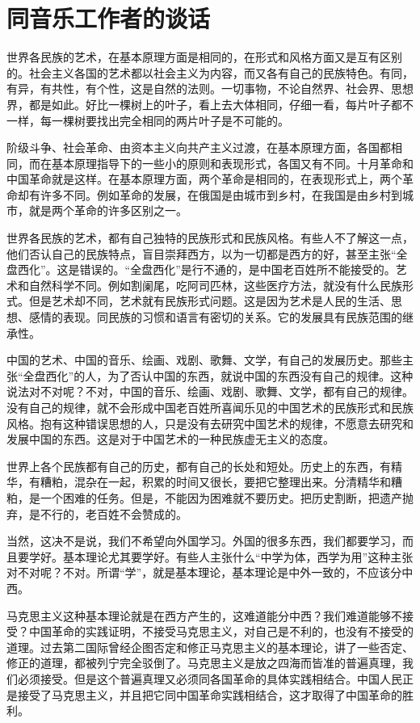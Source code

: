 \section[同音乐工作者的谈话（一九五六年八月十四日）]{同音乐工作者的谈话}


世界各民族的艺术，在基本原理方面是相同的，在形式和风格方面又是互有区别的。社会主义各国的艺术都以社会主义为内容，而又各有自己的民族特色。有同，有异，有共性，有个性，这是自然的法则。一切事物，不论自然界、社会界、思想界，都是如此。好比一棵树上的叶子，看上去大体相同，仔细一看，每片叶子都不一样，每一棵树要找出完全相同的两片叶子是不可能的。

阶级斗争、社会革命、由资本主义向共产主义过渡，在基本原理方面，各国都相同，而在基本原理指导下的一些小的原则和表现形式，各国又有不同。十月革命和中国革命就是这样。在基本原理方面，两个革命是相同的，在表现形式上，两个革命却有许多不同。例如革命的发展，在俄国是由城市到乡村，在我国是由乡村到城市，就是两个革命的许多区别之一。

世界各民族的艺术，都有自己独特的民族形式和民族风格。有些人不了解这一点，他们否认自己的民族特点，盲目崇拜西方，以为一切都是西方的好，甚至主张“全盘西化”。这是错误的。“全盘西化”是行不通的，是中国老百姓所不能接受的。艺术和自然科学不同。例如割阑尾，吃阿司匹林，这些医疗方法，就没有什么民族形式。但是艺术却不同，艺术就有民族形式问题。这是因为艺术是人民的生活、思想、感情的表现。同民族的习惯和语言有密切的关系。它的发展具有民族范围的继承性。

中国的艺术、中国的音乐、绘画、戏剧、歌舞、文学，有自己的发展历史。那些主张“全盘西化”的人，为了否认中国的东西，就说中国的东西没有自己的规律。这种说法对不对呢？不对，中国的音乐、绘画、戏剧、歌舞、文学，都有自己的规律。没有自己的规律，就不会形成中国老百姓所喜闻乐见的中国艺术的民族形式和民族风格。抱有这种错误思想的人，只是没有去研究中国艺术的规律，不愿意去研究和发展中国的东西。这是对于中国艺术的一种民族虚无主义的态度。

世界上各个民族都有自己的历史，都有自己的长处和短处。历史上的东西，有精华，有糟粕，混杂在一起，积累的时间又很长，要把它整理出来。分清精华和糟粕，是一个困难的任务。但是，不能因为困难就不要历史。把历史割断，把遗产抛弃，是不行的，老百姓不会赞成的。

当然，这决不是说，我们不希望向外国学习。外国的很多东西，我们都要学习，而且要学好。基本理论尤其要学好。有些人主张什么“中学为体，西学为用”这种主张对不对呢？不对。所谓“学”，就是基本理论，基本理论是中外一致的，不应该分中西。

马克思主义这种基本理论就是在西方产生的，这难道能分中西？我们难道能够不接受？中国革命的实践证明，不接受马克思主义，对自己是不利的，也没有不接受的道理。过去第二国际曾经企图否定和修正马克思主义的基本理论，讲了一些否定、修正的道理，都被列宁完全驳倒了。马克思主义是放之四海而皆准的普遍真理，我们必须接受。但是这个普遍真理又必须同各国革命的具体实践相结合。中国人民正是接受了马克思主义，并且把它同中国革命实践相结合，这才取得了中国革命的胜利。

